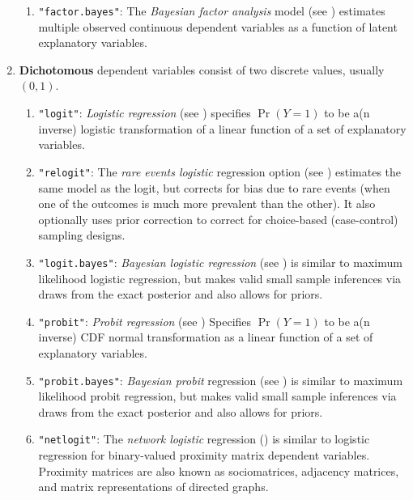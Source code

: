 \begin{enumerate}
\begin{enumerate}
\item {\tt "factor.bayes"}: The {\it Bayesian factor analysis} model (see
) estimates multiple observed continuous dependent variables
as a function of latent explanatory variables.

   \end{enumerate}
 \item {\bf Dichotomous} dependent variables consist of two discrete
values, usually $(0,1)$.  
   \begin{enumerate}
   \item {\tt "logit"}: {\it Logistic regression} (see )
     specifies $\Pr(Y=1)$ to be a(n inverse) logistic transformation
     of a linear function of a set of explanatory variables.
   \item {\tt "relogit"}: The {\it rare events logistic} regression
     option (see ) estimates the same model as the
     logit, but corrects for bias due to rare events (when one of the
     outcomes is much more prevalent than the other).  It also
     optionally uses prior correction to correct for choice-based
     (case-control) sampling designs.
   \item {\tt "logit.bayes"}: {\it Bayesian logistic regression} (see
) is similar to maximum likelihood logistic
regression, but makes valid small sample inferences via draws from the
exact posterior and also allows for priors.  
   \item {\tt "probit"}: {\it Probit regression} (see )
     Specifies $\Pr(Y=1)$ to be a(n inverse) CDF normal transformation
     as a linear function of a set of explanatory variables.
   \item {\tt "probit.bayes"}: {\it Bayesian probit} regression (see
) is similar to maximum likelihood probit
regression, but makes valid small sample inferences via draws from the
exact posterior and also allows for priors. 

  \item {\tt "netlogit"}: The {\it network logistic}
   regression () is similar to logistic regression
   for binary-valued proximity matrix dependent variables. Proximity
matrices are also known as sociomatrices, adjacency matrices, and
matrix representations of directed graphs.  


\end{enumerate}
\end{enumerate}
